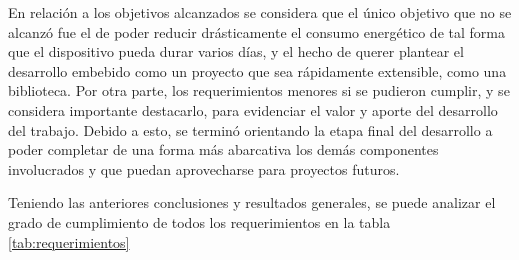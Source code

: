 En relación a los objetivos alcanzados se considera que el único objetivo que no se alcanzó fue el de poder reducir drásticamente el consumo energético de tal forma que el dispositivo pueda durar varios días, y el hecho de querer plantear el desarrollo embebido como un proyecto que sea rápidamente extensible, como una biblioteca. Por otra parte, los requerimientos menores si se pudieron cumplir, y se considera importante destacarlo, para evidenciar el valor y aporte del desarrollo del trabajo. Debido a esto, se terminó orientando la etapa final del desarrollo a poder completar de una forma más abarcativa los demás componentes involucrados y que puedan aprovecharse para proyectos futuros.

Teniendo las anteriores conclusiones y resultados generales, se puede analizar el grado de cumplimiento de todos los requerimientos en la tabla \ref{tab:requerimientos}

